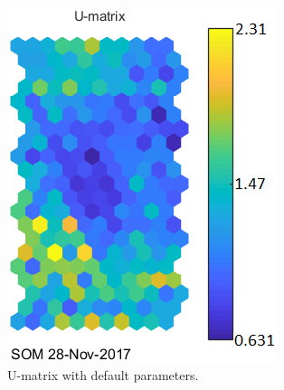 \documentclass[a4paper,11pt,twocolumn]{article}
\begin{document}
\begin{figure}[htbp]
\begin{minipage}[t]{0.45\linewidth}
  \centering
  \includegraphics[width=\linewidth]{figures/U-matrix.png}
  \caption{U-matrix with default parameters.}
  \label{fig:u}
\end{minipage}%
    \hfill%
\begin{minipage}[t]{0.45\linewidth}
  \centering

\end{minipage}
\end{figure}
\end{document}
